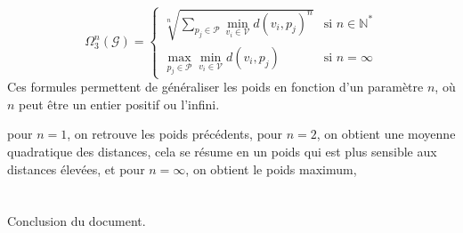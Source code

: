 \documentclass[12pt,a4paper]{article}
\begin{document}
\begin{equation*}
    \Omega_3^n(\mathcal{G}) = \begin{cases} 
        \sqrt[n]{\sum_{p_j \in \mathcal{P}} \min_{v_i \in \mathcal{V}} d(v_i, p_j)^n } & \text{si } n \in \mathbb{N}^*\\
        \max_{p_j \in \mathcal{P}} \min_{v_i \in \mathcal{V}} d(v_i, p_j) & \text{si } n = \infty
    \end{cases}
\end{equation*}
Ces formules permettent de généraliser les poids en fonction d'un paramètre \( n \),
où \( n \) peut être un entier positif ou l'infini.

pour $n=1$, on retrouve les poids précédents,
pour $n=2$, on obtient une moyenne quadratique des distances,
cela se résume en un poids qui est plus sensible aux distances élevées,
et pour \( n = \infty \), on obtient le poids maximum, 

\section{}

Conclusion du document.
\end{document}

